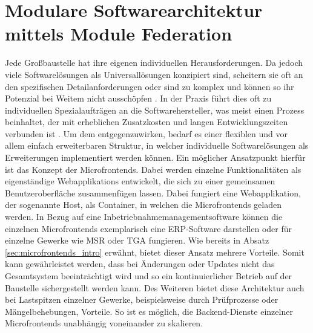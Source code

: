 \section{Modulare Softwarearchitektur mittels Module Federation} \label{sec:microfrontends}
Jede Großbaustelle hat ihre eigenen individuellen Herausforderungen. Da jedoch viele Softwarelösungen als Universallösungen konzipiert sind,
scheitern sie oft an den spezifischen Detailanforderungen oder sind zu komplex und können so ihr Potenzial bei Weitem nicht ausschöpfen \cite[Kap.~3.1]{feth2023studie}.
In der Praxis führt dies oft zu individuellen Spezialaufträgen an die Softwarehersteller, was meist einen Prozess beinhaltet, der mit erheblichen Zusatzkosten und langen Entwicklungszeiten verbunden ist \cite[Kap.~4.1]{feth2023studie}.
Um dem entgegenzuwirken, bedarf es einer flexiblen und vor allem einfach erweiterbaren Struktur, in welcher individuelle Softwarelösungen als Erweiterungen implementiert werden können.
Ein möglicher Ansatzpunkt hierfür ist das Konzept der Microfrontends. Dabei werden einzelne Funktionalitäten als eigenständige \glspl{Webapplikation} entwickelt,
die sich zu einer gemeinsamen Benutzeroberfläche zusammenfügen lassen. Dabei fungiert eine Webapplikation, der sogenannte Host, als Container, in welchen die Microfrontends geladen werden. In Bezug auf eine Inbetriebnahmemanagementsoftware können die einzelnen Microfrontends exemplarisch eine \ac{ERP}-Software darstellen oder für
einzelne Gewerke wie \ac{MSR} oder \ac{TGA} fungieren. Wie bereits in Absatz \ref{sec:microfrontends_intro} erwähnt, bietet dieser Ansatz mehrere Vorteile. Somit kann gewährleistet werden,
dass bei Änderungen oder Updates nicht das Gesamtsystem beeinträchtigt wird und so ein kontinuierlicher Betrieb auf der Baustelle sichergestellt werden kann.
Des Weiteren bietet diese Architektur auch bei Lastspitzen einzelner Gewerke, beispielsweise durch Prüfprozesse oder Mängelbehebungen, Vorteile. So ist es möglich, die Backend-Dienste einzelner
Microfrontends unabhängig voneinander zu skalieren.
